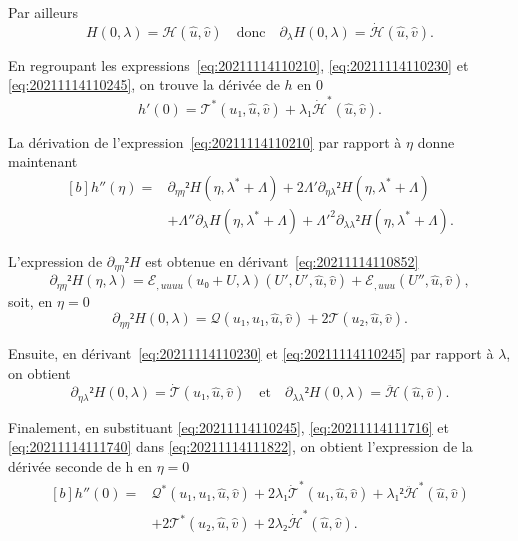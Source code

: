 \documentclass[12pt, final]{amsart}
\begin{document}
Par ailleurs
\begin{equation}
  \label{eq:20211114110245}
  H(0, \lambda)=\mathcal H(\hat{u}, \hat{v})
  \quad\text{donc}\quad
  \partial_\lambda H(0, \lambda)=\dot{\mathcal H}(\hat{u}, \hat{v}).
\end{equation}

En regroupant les expressions~\eqref{eq:20211114110210},
\eqref{eq:20211114110230} et \eqref{eq:20211114110245}, on trouve la dérivée de
\(h\) en 0
\begin{equation}
  h'(0)=\mathcal T^\ast(u₁, \hat{u}, \hat{v})
  +\lambda₁\dot{\mathcal H}^\ast(\hat{u}, \hat{v}).
\end{equation}

La dérivation de l'expression~\eqref{eq:20211114110210} par rapport à \(η\)
donne maintenant
\begin{equation}
  \label{eq:20211114111822}
  \begin{aligned}[b]
    h''(η)={}&\partial_{ηη}² H(η, \lambda^\ast+\Lambda)
    +2\Lambda'\partial_{η\lambda}² H(η, \lambda^\ast+\Lambda)\\
    &+\Lambda''\partial_{\lambda}H(η, \lambda^\ast+\Lambda)
    +\Lambda'^2\partial_{\lambda\lambda}²H(η, \lambda^\ast+\Lambda).
  \end{aligned}
\end{equation}

L'expression de \(\partial_{ηη}²H\) est obtenue en
dérivant~\eqref{eq:20211114110852}
\begin{equation}
  \partial_{ηη}²H(η, \lambda)
  =ℰ_{,uuuu}(u₀+U, \lambda)(U', U', \hat{u}, \hat{v})
  +ℰ_{,uuu}(U'', \hat{u}, \hat{v}),
\end{equation}
soit, en \(η=0\)
\begin{equation}
  \label{eq:20211114111716}
  \partial_{ηη}²H(0, \lambda)=\mathcal Q(u₁, u₁, \hat{u}, \hat{v})
  +2\mathcal T(u₂, \hat{u}, \hat{v}).
\end{equation}

Ensuite, en dérivant~\eqref{eq:20211114110230} et \eqref{eq:20211114110245} par
rapport à \(\lambda\), on obtient
\begin{equation}
  \label{eq:20211114111740}
  \partial_{η\lambda}²H(0, \lambda)=\dot{\mathcal T}(u₁, \hat{u}, \hat{v})
  \quad\text{et}\quad
  \partial_{\lambda\lambda}²H(0, \lambda)=\ddot{\mathcal H}(\hat{u}, \hat{v}).
\end{equation}

Finalement, en substituant \eqref{eq:20211114110245}, \eqref{eq:20211114111716}
et \eqref{eq:20211114111740} dans \eqref{eq:20211114111822}, on obtient
l'expression de la dérivée seconde de h en \(η=0\)
\begin{equation}
  \begin{aligned}[b]
    h''(0)={}&\mathcal Q^\ast(u₁, u₁, \hat{u}, \hat{v})
    +2\lambda₁\dot{\mathcal T}^\ast(u₁, \hat{u}, \hat{v})
    +\lambda₁²\ddot{\mathcal H}^\ast(\hat{u}, \hat{v})\\
    &+2\mathcal T^\ast(u₂, \hat{u}, \hat{v})
    +2\lambda₂\dot{\mathcal H}^\ast(\hat{u}, \hat{v}).
  \end{aligned}
\end{equation}
\end{document}
